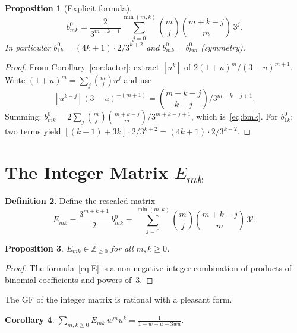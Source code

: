 \documentclass[11pt,a4paper]{article}
\theoremstyle{definition}
\newtheorem{definition}{Definition}[section]
\theoremstyle{plain}
\newtheorem{proposition}[definition]{Proposition}
\newtheorem{corollary}[definition]{Corollary}
\begin{document}
\begin{proposition}[Explicit formula]\label{prop:explicit}
\begin{equation}\label{eq:bmk}
  b_{mk}^0
  = \frac{2}{3^{m+k+1}}\sum_{j=0}^{\min(m,k)}\binom{m}{j}\binom{m+k-j}{m}\,3^j.
\end{equation}
In particular $b_{1k}^0 = (4k+1)\cdot 2/3^{k+2}$ and
$b_{mk}^0 = b_{km}^0$ (symmetry).
\end{proposition}

\begin{proof}
From Corollary~\ref{cor:factor}: extract $[u^k]$ of $2(1+u)^m/(3-u)^{m+1}$.
Write $(1+u)^m = \sum_j\binom{m}{j}u^j$ and use
\[
  [u^{k-j}](3-u)^{-(m+1)} = \binom{m+k-j}{k-j}/3^{m+k-j+1}.
\]
Summing: $b_{mk}^0 = 2\sum_{j}\binom{m}{j}\binom{m+k-j}{m}/3^{m+k-j+1}$,
which is~\eqref{eq:bmk}. For $b_{1k}^0$: two terms yield
$[(k+1)+3k]\cdot 2/3^{k+2} = (4k+1)\cdot 2/3^{k+2}$.
\end{proof}

\section{The Integer Matrix \texorpdfstring{$E_{mk}$}{E}}

\begin{definition}\label{def:E}
Define the rescaled matrix
\begin{equation}\label{eq:E}
  E_{mk} = \frac{3^{m+k+1}}{2}\,b_{mk}^0
  = \sum_{j=0}^{\min(m,k)}\binom{m}{j}\binom{m+k-j}{m}\,3^j.
\end{equation}
\end{definition}

\begin{proposition}\label{prop:E-integer}
$E_{mk}\in\mathbb{Z}_{\ge 0}$ for all $m,k\ge 0$.
\end{proposition}

\begin{proof}
The formula~\eqref{eq:E} is a non-negative integer combination of
products of binomial coefficients and powers of~$3$.
\end{proof}

The GF of the integer matrix is rational with a pleasant form.

\begin{corollary}\label{cor:E-gf}
$\displaystyle\sum_{m,k\ge 0}E_{mk}\,w^m u^k
= \frac{1}{1-w-u-3wu}$.
\end{corollary}
\end{document}
